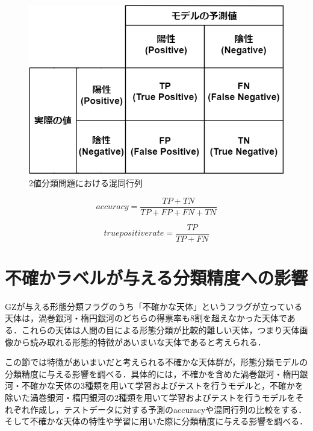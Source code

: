 \documentclass[a4j, 11pt]{jreport}
\begin{document}
\begin{figure}[H]
 \centering
 \includegraphics[width=12cm]{images/cm.png}
 \caption{2値分類問題における混同行列}
 \label{fig:cm}
\end{figure}

\begin{equation}
 accuracy = \frac{TP + TN}{TP + FP + FN + TN}
 \label{equ:accuracy}
\end{equation}

\begin{equation}
 true positive rate = \frac{TP}{TP + FN}
 \label{}
\end{equation}

\section{不確かラベルが与える分類精度への影響}
GZが与える形態分類フラグのうち「不確かな天体」というフラグが立っている天体は，渦巻銀河・楕円銀河のどちらの得票率も8割を超えなかった天体である．これらの天体は人間の目による形態分類が比較的難しい天体，つまり天体画像から読み取れる形態的特徴があいまいな天体であると考えられる．

この節では特徴があいまいだと考えられる不確かな天体群が，形態分類モデルの分類精度に与える影響を調べる．具体的には，不確かを含めた渦巻銀河・楕円銀河・不確かな天体の3種類を用いて学習およびテストを行うモデルと，不確かを除いた渦巻銀河・楕円銀河の2種類を用いて学習およびテストを行うモデルをそれぞれ作成し，テストデータに対する予測のaccuracyや混同行列の比較をする．そして不確かな天体の特性や学習に用いた際に分類精度に与える影響を調べる．
\end{document}
